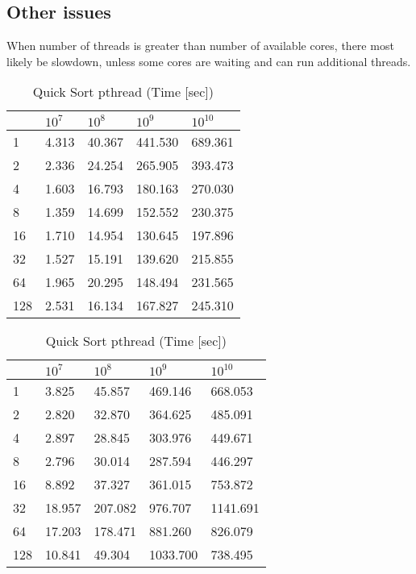 \documentclass{article}
\begin{document}
\subsection{\textbf{Other issues}} 
When number of threads is greater than number of available cores, there most likely be
slowdown, unless some cores are waiting and can run additional threads.


\begin{table}[h!]
\begin{minipage}{0.48\textwidth}
\centering
\caption{Quick Sort omp (Time [sec])}
\label{my-label}
\begin{tabular}{l|llll}
&      $10^7$           &    $10^8$ & $10^9$    &  $10^{10}$    \\ \hline
1       &       4.313   &   40.367  & 441.530 & 689.361    \\ \hline
2       &       2.336   &   24.254  & 265.905& 393.473    \\ \hline
4       &       1.603   &   16.793  & 180.163 & 270.030    \\ \hline
8       & \cellcolor[HTML]{34FF34}      1.359   & \cellcolor[HTML]{34FF34}  14.699  & 152.552 & 230.375    \\ \hline
16      &       1.710   &   14.954  & \cellcolor[HTML]{34FF34}130.645 & \cellcolor[HTML]{34FF34}197.896    \\ \hline
32      &       1.527   &   15.191  & 139.620 & 215.855    \\ \hline
64      &       1.965   &   20.295  & 148.494 & 231.565    \\ \hline
128     &       2.531   &   16.134  & 167.827 & 245.310    \\ 
\end{tabular}
\end{minipage}%
\begin{minipage}{0.48\textwidth}
\centering
\caption{Quick Sort pthread (Time [sec])}
\label{my-label}
\begin{tabular}{l|llll}
&      $10^7$       &    $10^8$    & $10^9$      &  $10^{10}$  \\ \hline
1       &       3.825     &   45.857  & 469.146  &  668.053    \\ \hline
2       &       2.820     &   32.870  & 364.625  &  485.091    \\ \hline
4       &       2.897     &   28.845  & 303.976  &  449.671    \\ \hline
8       &  \cellcolor[HTML]{34FF34}     2.796     &  \cellcolor[HTML]{34FF34} 30.014  & \cellcolor[HTML]{34FF34} 287.594  & \cellcolor[HTML]{34FF34} 446.297    \\ \hline
16      &       8.892     &   37.327  & 361.015  &  753.872    \\ \hline
32      &       18.957    &   207.082 & 976.707  &  1141.691   \\ \hline
64      &       17.203    &   178.471 & 881.260  &  826.079    \\ \hline
128     &       10.841    &   49.304  & 1033.700 &  738.495    \\ 
\end{tabular}
\end{minipage}%
\end{table}
\end{document}
